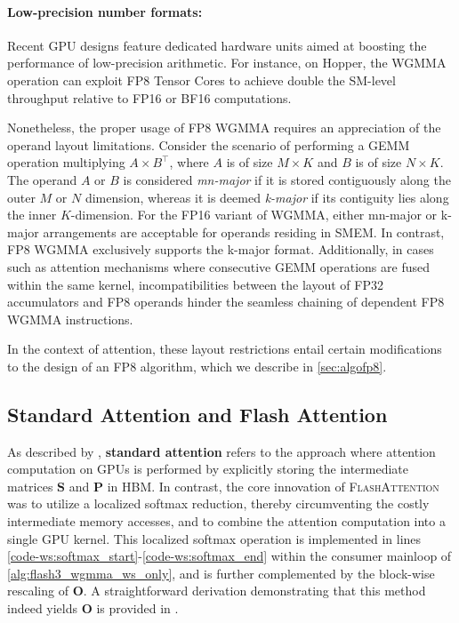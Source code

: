 \paragraph{Low-precision number formats:}
\label{sec:low-precision-gpu}
Recent GPU designs feature dedicated hardware units aimed at boosting the performance of low-precision arithmetic. For instance, on Hopper, the WGMMA operation can exploit FP8 Tensor Cores to achieve double the SM-level throughput relative to FP16 or BF16 computations.

Nonetheless, the proper usage of FP8 WGMMA requires an appreciation of the operand layout limitations. Consider the scenario of performing a GEMM operation multiplying $A \times B^{\top}$, where $A$ is of size $M \times K$ and $B$ is of size $N \times K$. The operand $A$ or $B$ is considered \emph{mn-major} if it is stored contiguously along the outer $M$ or $N$ dimension, whereas it is deemed \emph{k-major} if its contiguity lies along the inner $K$-dimension. For the FP16 variant of WGMMA, either mn-major or k-major arrangements are acceptable for operands residing in SMEM. In contrast, FP8 WGMMA exclusively supports the k-major format. Additionally, in cases such as attention mechanisms where consecutive GEMM operations are fused within the same kernel, incompatibilities between the layout of FP32 accumulators and FP8 operands hinder the seamless chaining of dependent FP8 WGMMA instructions.

In the context of attention, these layout restrictions entail certain modifications to the design of an FP8 algorithm, which we describe in \cref{sec:algofp8}.

\subsection{Standard Attention and Flash Attention} As described by \citet{dao2022flashattention}, \textbf{standard attention} refers to the approach where attention computation on GPUs is performed by explicitly storing the intermediate matrices $\mathbf{S}$ and $\mathbf{P}$ in HBM. In contrast, the core innovation of \textsc{FlashAttention} was to utilize a localized softmax reduction, thereby circumventing the costly intermediate memory accesses, and to combine the attention computation into a single GPU kernel. This localized softmax operation is implemented in lines \ref{code-ws:softmax_start}-\ref{code-ws:softmax_end} within the consumer mainloop of \cref{alg:flash3_wgmma_ws_only}, and is further complemented by the block-wise rescaling of $\mathbf{O}$. A straightforward derivation demonstrating that this method indeed yields $\mathbf{O}$ is provided in \cite[\S 2.3.1]{dao2023flashattention2}.


